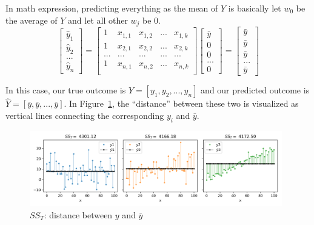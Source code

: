 \documentclass[
	letterpaper
]{article}
\begin{document}
In math expression, predicting everything as the mean of $Y$ is basically let $w_0$ be the average of $Y$ and let all other $w_j$ be 0.
\begin{equation}
\begin{bmatrix}\hat y_1 \\ \hat y_2 \\ ... \\ \hat y_n\end{bmatrix}
 = \begin{bmatrix}
1 & x_{1, 1} & x_{1, 2} & ... & x_{1, k} \\
1 & x_{2, 1} & x_{2, 2} & ... & x_{2, k} \\
... & ... & ... & ... & ... \\
1 & x_{n, 1} & x_{n, 2} & ... & x_{n, k} \\
\end{bmatrix}
\begin{bmatrix} \bar y \\ 0 \\  0 \\ ... \\ 0\end{bmatrix}
=
\begin{bmatrix} \bar y \\ \bar y \\ \bar y \\ ... \\ \bar y\end{bmatrix}
\end{equation}

In this case, our true outcome is $Y = [y_1, y_2, ..., y_n]$ and our predicted outcome is $\hat Y = [\bar y, \bar y, ..., \bar y]$.
In Figure~\ref{fig:sst}, the ``distance'' between these two is visualized as vertical lines connecting the corresponding $y_i$ and $\bar y$.
\begin{figure}[htbp]
	\centering
	\includegraphics[width=0.98\textwidth]{figures/comparison-sst.png}
	\caption{$SS_T$: distance between $y$ and $\bar y$}
	\label{fig:sst}
\end{figure}
\end{document}
